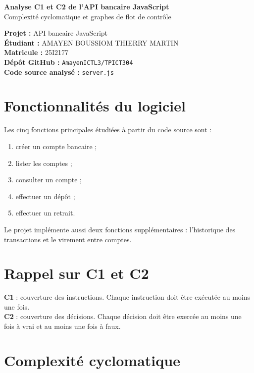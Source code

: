 \documentclass[11pt,a4paper]{article}
\begin{document}
\begin{center}
    {\LARGE\bfseries Analyse C1 et C2 de l'API bancaire JavaScript}\\[0.25cm]
    {\large Complexité cyclomatique et graphes de flot de contrôle}\\[0.5cm]
\end{center}

\textbf{Projet :} API bancaire JavaScript\\
\textbf{Étudiant :} AMAYEN BOUSSIOM THIERRY MARTIN\\
\textbf{Matricule :} 25I2177\\
\textbf{Dépôt GitHub :} \texttt{AmayenICTL3/TPICT304}\\
\textbf{Code source analysé :} \texttt{server.js}

\section{Fonctionnalités du logiciel}

Les cinq fonctions principales étudiées à partir du code source sont :

\begin{enumerate}[leftmargin=1.2cm]
    \item créer un compte bancaire ;
    \item lister les comptes ;
    \item consulter un compte ;
    \item effectuer un dépôt ;
    \item effectuer un retrait.
\end{enumerate}

Le projet implémente aussi deux fonctions supplémentaires : l'historique des transactions et le virement entre comptes.

\section{Rappel sur C1 et C2}

\textbf{C1} : couverture des instructions. Chaque instruction doit être exécutée au moins une fois.\\
\textbf{C2} : couverture des décisions. Chaque décision doit être exercée au moins une fois à vrai et au moins une fois à faux.

\section{Complexité cyclomatique}
\end{document}
